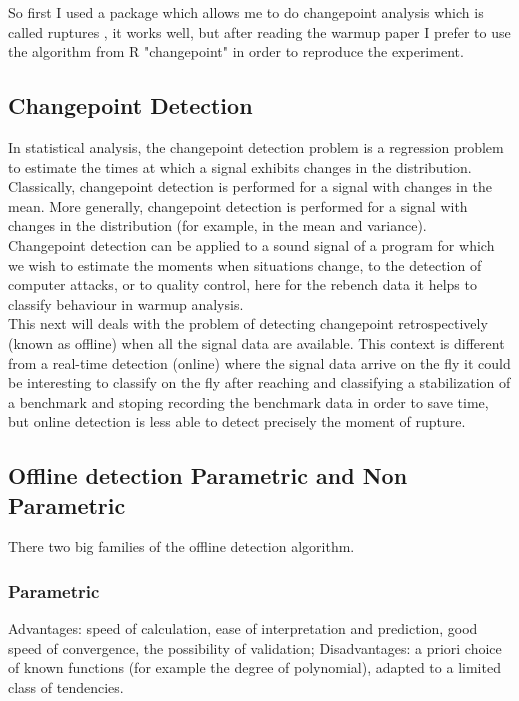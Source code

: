 \documentclass{article}
\begin{document}
So first I used a package which allows me to do changepoint analysis which is called ruptures \cite{truong2020selective}, it works well, but after reading the warmup paper I prefer to use the algorithm from R "changepoint" \cite{killick2014changepoint} in order to reproduce the experiment.



\subsection{Changepoint Detection}
In statistical analysis, the changepoint detection problem is a regression problem to estimate the times at which a signal exhibits changes in the distribution. Classically, changepoint detection is performed for a signal with changes in the mean. More generally, changepoint detection is performed for a signal with changes in the distribution (for example, in the mean and variance). \\

Changepoint detection can be applied to a sound signal of a program for which we wish to estimate the moments when situations change, to the detection of computer attacks, or to quality control, here for the rebench data it helps to classify behaviour in warmup analysis. \\

This next will deals with the problem of detecting changepoint retrospectively (known as offline) when all the signal data are available. This context is different from a real-time detection (online) where the signal data arrive on the fly it could be interesting to classify on the fly after reaching and classifying a stabilization of a benchmark and stoping recording the benchmark data in order to save time, but online detection is less able to detect precisely the moment of rupture.

\subsection{Offline detection Parametric and Non Parametric}
 
 
There two big families of the offline detection algorithm.

\subsubsection{Parametric}

Advantages: speed of calculation, ease of interpretation and prediction,
good speed of convergence, the possibility of validation;
Disadvantages: a priori choice of known functions (for example the degree of polynomial), adapted to a limited class of tendencies.
\end{document}
